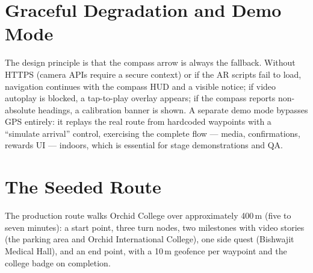 \section{Graceful Degradation and Demo Mode}
The design principle is that the compass arrow is always the fallback.
Without HTTPS (camera APIs require a secure context) or if the AR scripts
fail to load, navigation continues with the compass HUD and a visible
notice; if video autoplay is blocked, a tap-to-play overlay appears; if the
compass reports non-absolute headings, a calibration banner is shown.
A separate demo mode bypasses GPS entirely: it replays the real route from
hardcoded waypoints with a ``simulate arrival'' control, exercising the
complete flow --- media, confirmations, rewards UI --- indoors, which is
essential for stage demonstrations and QA.

\section{The Seeded Route}
The production route walks Orchid College over approximately 400\,m
(five to seven minutes): a start point, three turn nodes, two milestones
with video stories (the parking area and Orchid International College), one
side quest (Bishwajit Medical Hall), and an end point, with a 10\,m
geofence per waypoint and the college badge on completion.
